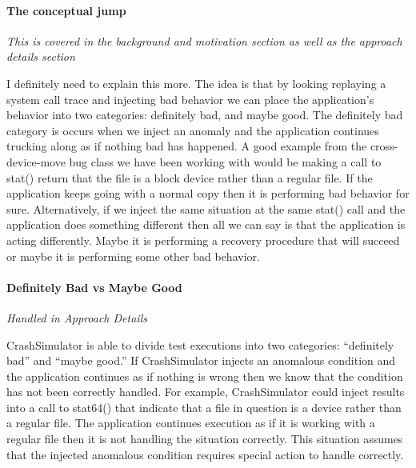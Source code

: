 \paragraph{The conceptual jump}

\emph{This is covered in the background and motivation section as well as the approach details section}

I definitely need to explain this more.  The idea is that by looking replaying a system call trace and injecting bad
behavior we can place the application's behavior into two categories: definitely bad, and maybe good.  The definitely
bad category is occurs when we inject an anomaly and the application continues trucking along as if nothing bad has
happened.  A good example from the cross-device-move bug class we have been working with would be making a call to
stat() return that the file is a block device rather than a regular file. If the application keeps going with a normal
copy then it is performing bad behavior for sure. Alternatively, if we inject the same situation at the same stat()
call and the application does something different then all we can say is that the application is acting
differently. Maybe it is performing a recovery procedure that will succeed or maybe it is performing some other bad
behavior.

\paragraph{Definitely Bad vs Maybe Good}

\emph{Handled in Approach Details}

CrashSimulator is able to divide test executions into two categories: ``definitely bad'' and ``maybe good.''  If
CrashSimulator injects an anomalous condition and the application continues as if nothing is wrong then we know that the
condition has not been correctly handled.  For example, CrashSimulator could inject results into a call to stat64() that
indicate that a file in question is a device rather than a regular file.  The application continues execution as if
it is working with a regular file then it is not handling the situation correctly. This situation assumes that the
injected anomalous condition requires special action to handle correctly.


